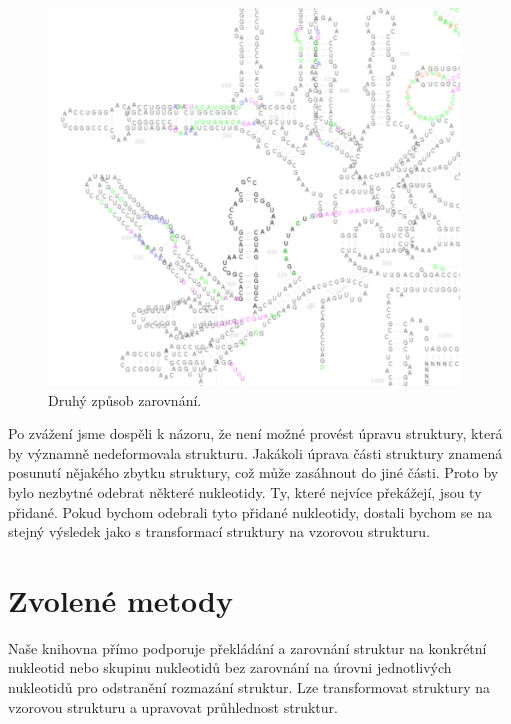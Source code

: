 \begin{figure}[H]
  \centering
  \includegraphics[height=100mm]{../img/kap02/tree/align2.png}
  \caption[Druhý způsob zarovnání]{Druhý způsob zarovnání.}
  \label{secondalign}
\end{figure}

Po zvážení jsme dospěli k názoru, že není možné provést úpravu struktury, která
by významně nedeformovala strukturu. Jakákoli úprava části struktury znamená
posunutí nějakého zbytku struktury, což může zasáhnout do jiné části. Proto by
bylo nezbytné odebrat některé nukleotidy. Ty, které nejvíce překážejí, jsou ty
přidané. Pokud bychom odebrali tyto přidané nukleotidy, dostali bychom se na
stejný výsledek jako s transformací struktury na vzorovou strukturu.

\section{Zvolené metody}

Naše knihovna přímo podporuje překládání a zarovnání struktur na konkrétní
nukleotid nebo skupinu nukleotidů bez zarovnání na úrovni jednotlivých
nukleotidů pro odstranění rozmazání struktur. Lze transformovat struktury na
vzorovou strukturu a upravovat průhlednost struktur.

